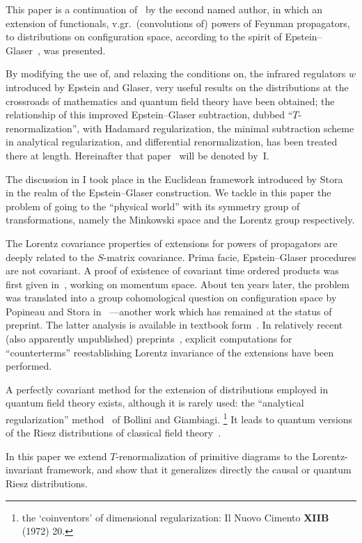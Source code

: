 \documentclass[a4paper,12pt]{article}
\newcommand{\7}{\dagger}           %
\theoremstyle{plain}
\theoremstyle{definition}
\begin{document}
This paper is a continuation of~\cite{Carme} by the second named
author, in which an extension of functionals, v.gr.\ (convolutions of)
powers of Feynman propagators, to distributions on configuration
space, according to the spirit of Epstein--Glaser~\cite{EG}, was
presented.

By modifying the use of, and relaxing the conditions on, the infrared
regulators $w$ introduced by Epstein and Glaser, very useful results
on the distributions at the crossroads of mathematics and quantum
field theory have been obtained; the relationship of this improved
Epstein--Glaser subtraction, dubbed ``$T$-renormalization'', with
Hadamard regularization, the minimal subtraction scheme in analytical
regularization, and differential renormalization, has been treated
there at length. Hereinafter that paper~\cite{Carme} will be denoted
by~I.

The discussion in I took place in the Euclidean framework introduced
by Stora~\cite{EllRen} in the realm of the Epstein--Glaser
construction. We tackle in this paper the problem of going to the
``physical world'' with its symmetry group of transformations, namely
the Minkowski space and the Lorentz group respectively.

The Lorentz covariance properties of extensions for powers of
propagators are deeply related to the $S$-matrix covariance. Prima
facie, Epstein--Glaser procedures are not covariant. A proof of
existence of covariant time ordered products was first given
in~\cite{EG}, working on momentum space. About ten years later, the
problem was translated into a group cohomological question on
configuration space by Popineau and Stora in~\cite{PoSt} ---another
work which has remained at the status of preprint. The latter analysis
is available in textbook form~\cite{Scharf}. In relatively recent
(also apparently unpublished) preprints~\cite{Prangeetal, PrangeII},
explicit computations for ``counterterms'' reestablishing Lorentz
invariance of the extensions have been performed.

A perfectly covariant method for the extension of distributions
employed in quantum field theory exists, although it is rarely used:
the ``analytical regularization'' method~\cite{ThreeFromBA} of Bollini
and Giambiagi.%
\footnote{the `coinventors' of dimensional regularization:
Il Nuovo Cimento {\bf XIIB} (1972) 20.}
It leads to quantum versions of the Riesz distributions of classical
field theory~\cite{Riesz, Jager, Kanwal}.

In this paper we extend $T$-renormalization of primitive diagrams to
the Lorentz-invariant framework, and show that it generalizes directly
the causal or quantum Riesz distributions.
\end{document}
